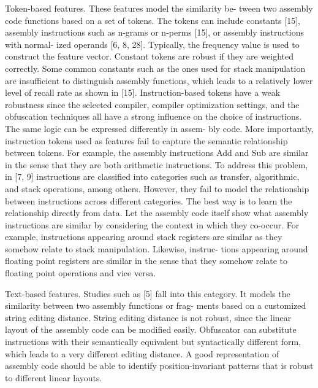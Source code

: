 Token-based features. These features model the similarity be-
tween two assembly code functions based on a set of tokens. The
tokens can include constants [15], assembly instructions such as
n-grams or n-perms [15], or assembly instructions with normal-
ized operands [6, 8, 28]. Typically, the frequency value is used to
construct the feature vector. Constant tokens are robust if they
are weighted correctly. Some common constants such as the ones
used for stack manipulation are insufficient to distinguish assembly
functions, which leads to a relatively lower level of recall rate as
shown in [15]. Instruction-based tokens have a weak robustness
since the selected compiler, compiler optimization settings, and the
obfuscation techniques all have a strong influence on the choice of
instructions. The same logic can be expressed differently in assem-
bly code. More importantly, instruction tokens used as features fail
to capture the semantic relationship between tokens. For example,
the assembly instructions Add and Sub are similar in the sense
that they are both arithmetic instructions. To address this problem,
in [7, 9] instructions are classified into categories such as transfer,
algorithmic, and stack operations, among others. However, they
fail to model the relationship between instructions across different
categories. The best way is to learn the relationship directly from
data. Let the assembly code itself show what assembly instructions
are similar by considering the context in which they co-occur. For
example, instructions appearing around stack registers are similar
as they somehow relate to stack manipulation. Likewise, instruc-
tions appearing around floating point registers are similar in the
sense that they somehow relate to floating point operations and
vice versa.

Text-based features. Studies such as [5] fall into this category.
It models the similarity between two assembly functions or frag-
ments based on a customized string editing distance. String editing
distance is not robust, since the linear layout of the assembly code
can be modified easily. Obfuscator can substitute instructions with
their semantically equivalent but syntactically different form, which
leads to a very different editing distance. A good representation of
assembly code should be able to identify position-invariant patterns
that is robust to different linear layouts.

